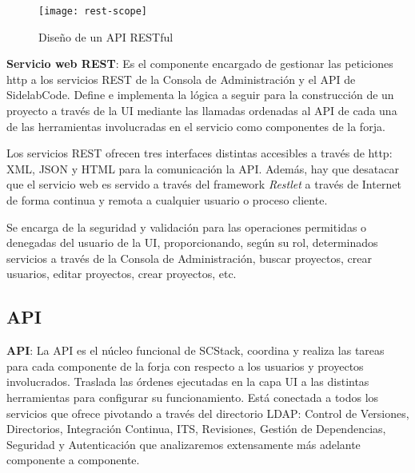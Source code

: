 \begin{figure}[H]
    \centering
    \texttt{[image: rest-scope]}
    \caption{Diseño de un API RESTful}
    \label{fig:rest-scope}
\end{figure}

\par \textbf{Servicio web REST}: Es el componente encargado de gestionar las peticiones http a los servicios REST de la Consola de Administración y el API de SidelabCode. Define e implementa la lógica a seguir para la construcción de un proyecto a través de la UI mediante las llamadas ordenadas al API de cada una de las herramientas involucradas en el servicio como componentes de la forja.

\par Los servicios REST ofrecen tres interfaces distintas accesibles a través de http: XML, JSON y HTML para la comunicación la API. Además, hay que desatacar que el servicio web es servido a través del framework \emph{Restlet} a través de Internet de forma continua y remota a cualquier usuario o proceso cliente.

\par Se encarga de la seguridad y validación para las operaciones permitidas o denegadas del usuario de la UI, proporcionando, según su rol, determinados servicios a través de la Consola de Administración, buscar proyectos, crear usuarios, editar proyectos, crear proyectos, etc.



\subsection{API}
\label{sub:api}

\par \textbf{API}: La API es el núcleo funcional de SCStack, coordina y realiza las tareas para cada componente de la forja con respecto a los usuarios y proyectos involucrados. Traslada las órdenes ejecutadas en la capa UI a las distintas herramientas para configurar su funcionamiento. Está conectada a todos los servicios que ofrece pivotando a través del directorio LDAP: Control de Versiones, Directorios, Integración Continua, ITS, Revisiones, Gestión de Dependencias, Seguridad y Autenticación que analizaremos extensamente más adelante componente a componente.

